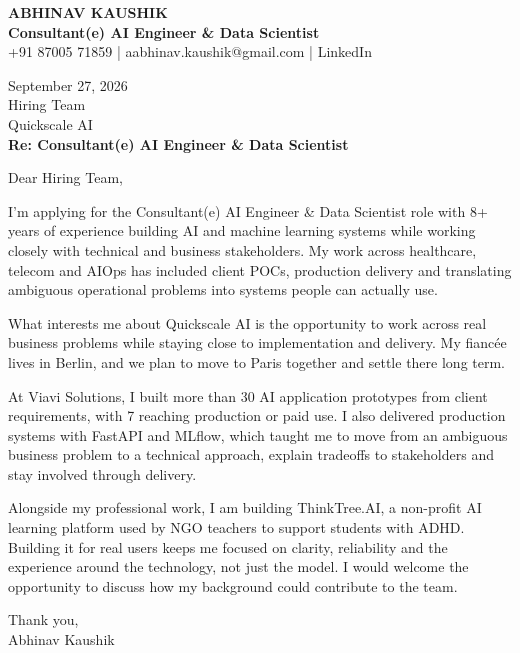 \documentclass[10pt,a4paper]{article}
\begin{document}
\begin{center}
{\Large\bfseries ABHINAV KAUSHIK}\\[2pt]
{\bfseries Consultant(e) AI Engineer \& Data Scientist}\\[2pt]
+91 87005 71859 \quad | \quad aabhinav.kaushik@gmail.com \quad | \quad LinkedIn
\end{center}
\vspace{8pt}
September 27, 2026\\[6pt]
Hiring Team\\
Quickscale AI\\[4pt]
\textbf{Re: Consultant(e) AI Engineer \& Data Scientist}

Dear Hiring Team,

I’m applying for the Consultant(e) AI Engineer \& Data Scientist role with 8+ years of experience building AI and machine learning systems while working closely with technical and business stakeholders. My work across healthcare, telecom and AIOps has included client POCs, production delivery and translating ambiguous operational problems into systems people can actually use.

What interests me about Quickscale AI is the opportunity to work across real business problems while staying close to implementation and delivery. My fiancée lives in Berlin, and we plan to move to Paris together and settle there long term.

At Viavi Solutions, I built more than 30 AI application prototypes from client requirements, with 7 reaching production or paid use. I also delivered production systems with FastAPI and MLflow, which taught me to move from an ambiguous business problem to a technical approach, explain tradeoffs to stakeholders and stay involved through delivery.

Alongside my professional work, I am building ThinkTree.AI, a non-profit AI learning platform used by NGO teachers to support students with ADHD. Building it for real users keeps me focused on clarity, reliability and the experience around the technology, not just the model. I would welcome the opportunity to discuss how my background could contribute to the team.

Thank you,\\
Abhinav Kaushik
\end{document}
